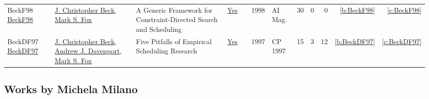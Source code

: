 {\begin{longtable}{>{\raggedright\arraybackslash}p{3cm}>{\raggedright\arraybackslash}p{6cm}>{\raggedright\arraybackslash}p{6.5cm}rrrp{2.5cm}rrrrr}
BeckF98 \href{https://doi.org/10.1609/aimag.v19i4.1426}{BeckF98} & \hyperref[auth:a89]{J. Christopher Beck}, \hyperref[auth:a305]{Mark S. Fox} & A Generic Framework for Constraint-Directed Search and Scheduling & \href{works/BeckF98.pdf}{Yes} & \cite{BeckF98} & 1998 & {AI} Mag. & 30 & 0 & 0 & \ref{b:BeckF98} & \ref{c:BeckF98}\\
BeckDF97 \href{https://doi.org/10.1007/BFb0017455}{BeckDF97} & \hyperref[auth:a89]{J. Christopher Beck}, \hyperref[auth:a251]{Andrew J. Davenport}, \hyperref[auth:a305]{Mark S. Fox} & Five Pitfalls of Empirical Scheduling Research & \href{works/BeckDF97.pdf}{Yes} & \cite{BeckDF97} & 1997 & CP 1997 & 15 & 3 & 12 & \ref{b:BeckDF97} & \ref{c:BeckDF97}\\
\end{longtable}
}

\subsection{Works by Michela Milano}
\label{sec:a144}

